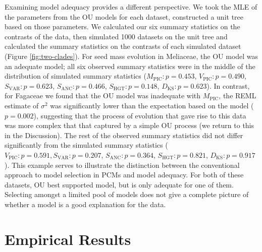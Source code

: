 \documentclass[a4paper,12pt]{article}
\begin{document}
Examining model adequacy provides a different perspective. We took the MLE of the parameters from the OU models for each dataset, constructed a unit tree based on those parameters. We calculated our six summary statistics on the contrasts of the data, then simulated 1000 datasets on the unit tree and calculated the summary statistics on the contrasts of each simulated dataset (Figure \ref{fig:two-clades}). For seed mass evolution in Meliaceae, the OU model was an adequate model; all six observed summary statistics were in the middle of the distribution of simulated summary statistics ($M_{\text{PIC}}: p=0.453$, $V_{\text{PIC}}: p=0.490$, $S_{\text{VAR}}: p=0.623$, $S_{\text{ANC}}:p=0.466$, $S_{\text{HGT}}: p=0.148$, $D_{\text{KS}}: p=0.623$). In contrast, for Fagaceae we found that the OU model was inadequate with $M_{\text{PIC}}$, the REML estimate of $\sigma^2$ was significantly lower than the expectation based on the model ($p=0.002$), suggesting that the process of evolution that gave rise to this data was more complex that that captured by a simple OU process (we return to this in the Discussion).  The rest of the observed summary statistics did not differ significantly from the simulated summary statistics ($V_{\text{PIC}}:p=0.591, S_{\text{VAR}}: p=0.207$, $S_{\text{ANC}}:p=0.364$, $S_{\text{HGT}}: p=0.821$, $D_{\text{KS}}: p=0.917$). This example serves to illustrate the distinction between the conventional approach to model selection in PCMs and model adequacy. For both of these datasets, OU best supported model, but is only adequate for one of them. Selecting amongst a limited pool of models does not give a complete picture of whether a model is a good explanation for the data.


\section{Empirical Results}
\end{document}
